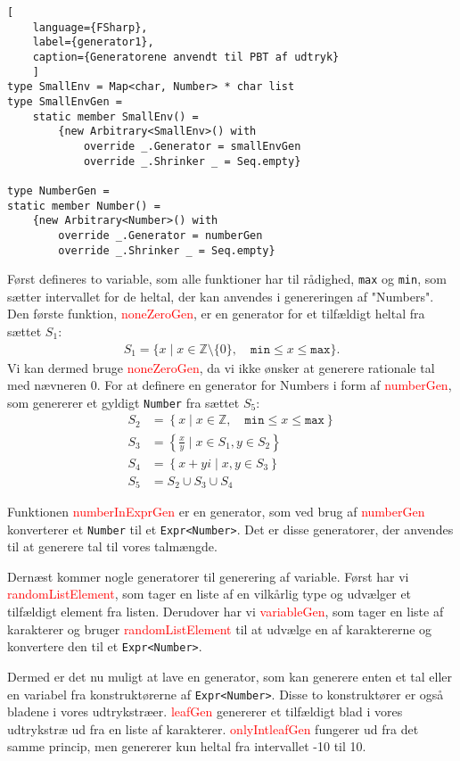 \begin{lstlisting}[
    language={FSharp}, 
    label={generator1}, 
    caption={Generatorene anvendt til PBT af udtryk}
    ]
type SmallEnv = Map<char, Number> * char list
type SmallEnvGen =
    static member SmallEnv() =
        {new Arbitrary<SmallEnv>() with
            override _.Generator = smallEnvGen
            override _.Shrinker _ = Seq.empty}

type NumberGen =
static member Number() =
    {new Arbitrary<Number>() with
        override _.Generator = numberGen
        override _.Shrinker _ = Seq.empty}    
\end{lstlisting}

Først defineres to variable, som alle funktioner har til rådighed, \texttt{max} og \texttt{min}, som sætter intervallet for de heltal, der kan anvendes i genereringen af "Numbers". 
Den første funktion, \textcolor{red}{noneZeroGen}, er en generator for et tilfældigt heltal fra sættet $S_1$:
\begin{gather*}
    S_1 = \{ x \mid x \in \mathbb{Z} \setminus \{0\}, \quad \texttt{min} \leq x \leq \texttt{max} \}.
\end{gather*}
Vi kan dermed bruge \textcolor{red}{noneZeroGen}, da vi ikke ønsker at generere rationale tal med nævneren 0. For at definere en generator for Numbers i form af \textcolor{red}{numberGen}, som genererer et gyldigt \texttt{Number} fra sættet $S_5$:
\begin{align*}
    S_2 &= \left\{ x \mid x \in \mathbb{Z}, \quad \texttt{min} \leq x \leq \texttt{max} \right\} \\
    S_3 &= \left\{ \frac{x}{y} \mid x \in S_1, y \in S_2 \right\} \\
    S_4 &= \left\{ x + yi \mid x, y \in S_3 \right\} \\
    S_5 &= S_2 \cup S_3 \cup S_4
\end{align*}

Funktionen \textcolor{red}{numberInExprGen} er en generator, som ved brug af \textcolor{red}{numberGen} konverterer et \texttt{Number} til et \texttt{Expr<Number>}. Det er disse generatorer, der anvendes til at generere tal til vores talmængde.

Dernæst kommer nogle generatorer til generering af variable. Først har vi \textcolor{red}{randomListElement}, som tager en liste af en vilkårlig type og udvælger et tilfældigt element fra listen. Derudover har vi \textcolor{red}{variableGen}, som tager en liste af karakterer og bruger \textcolor{red}{randomListElement} til at udvælge en af karaktererne og konvertere den til et \texttt{Expr<Number>}.

Dermed er det nu muligt at lave en generator, som kan generere enten et tal eller en variabel fra konstruktørerne af \texttt{Expr<Number>}. Disse to konstruktører er også bladene i vores udtrykstræer. \textcolor{red}{leafGen} genererer et tilfældigt blad i vores udtrykstræ ud fra en liste af karakterer. \textcolor{red}{onlyIntleafGen} fungerer ud fra det samme princip, men genererer kun heltal fra intervallet -10 til 10.

